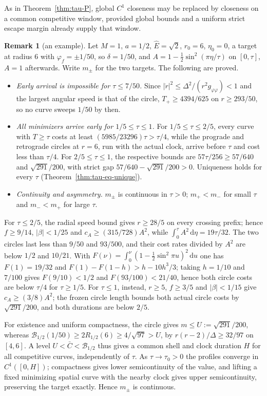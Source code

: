 \documentclass[aip,jmp,amsmath,amssymb,reprint]{revtex4-2}
\newcommand{\Ehat}{\hat E}
\newcommand{\dd}{\mathrm{d}}
\theoremstyle{plain}
\theoremstyle{definition}
\newtheorem{remark}[proposition]{Remark}
\begin{document}
As in Theorem~\ref{thm:tau-P}, global $C^1$ closeness may be replaced by closeness on a common
competitive window, provided global bounds and a uniform strict escape margin already supply that
window.

\begin{remark}[an example]\label{rmk:tau-eq-example}
Let $M=1$, $a=1/2$, $\Ehat=\sqrt2$, $r_0=6$, $\eta_0=0$, a target at radius $6$ with $\varphi_f=\pm1/50$, so
$\delta=1/50$, and $A=1-\frac12\sin^2(\pi\eta/\tau)$ on $[0,\tau]$, $A=1$ afterwards. Write $m_\pm$ for the two
targets. The following are proved.
\begin{itemize}
\item \emph{Early arrival is impossible for $\tau\le7/50$.} Since $|\dot r|^2\le\Delta^2/(r^2g_{\varphi\varphi})<1$
  and the largest angular speed is that of the circle, $T_+\ge4394/625$ on $r\ge293/50$, so no curve
  sweeps $1/50$ by then.
\item \emph{All minimizers arrive early for $1/5\le\tau\le1$.} For $1/5\le\tau\le2/5$, every curve with
  $T\ge\tau$ costs at least $(5985/23296)\tau>\tau/4$, while the prograde and retrograde circles at $r=6$,
  run with the actual clock, arrive before $\tau$ and cost less than $\tau/4$. For $2/5\le\tau\le1$, the
  respective bounds are $57\tau/256\ge57/640$ and $\sqrt{291}/200$, with strict gap
  $57/640-\sqrt{291}/200>0$. Uniqueness holds for every $\tau$ (Theorem~\ref{thm:tau-eq-unique}).
\item \emph{Continuity and asymmetry.} $m_\pm$ is continuous in $\tau>0$; $m_+<m_-$ for small $\tau$ and
  $m_-<m_+$ for large $\tau$.
\end{itemize}
For $\tau\le2/5$, the radial speed bound gives $r\ge28/5$ on every crossing prefix; hence $f\ge9/14$,
$|\beta|<1/25$ and $c_A\ge(315/728)A^2$, while $\int_0^\tau A^2\,\dd\eta=19\tau/32$. The two circles last less
than $9/50$ and $93/500$, and their cost rates divided by $A^2$ are below $1/2$ and $10/21$. With
$F(\nu)=\int_0^\nu(1-\frac12\sin^2\pi u)^2\,\dd u$ one has $F(1)=19/32$ and $F(1)-F(1-h)>h-10h^3/3$; taking
$h=1/10$ and $7/100$ gives $F(9/10)<1/2$ and $F(93/100)<21/40$, hence both circle costs are below
$\tau/4$ for $\tau\ge1/5$. For $\tau\le1$, instead, $r\ge5$, $f\ge3/5$ and $|\beta|<1/15$ give $c_A\ge(3/8)A^2$;
the frozen circle length bounds both actual circle costs by $\sqrt{291}/200$, and both durations are
below $2/5$.

For existence and uniform compactness, the circle gives $m\le U:=\sqrt{291}/200$, whereas
$\mathcal B_{1/2}(1/50)\ge2R_{1/2}(6)\ge4/\sqrt{97}>U$, by $r(r-2)/\Delta\ge32/97$ on $[4,6]$. A level
$U<\bar C<\mathcal B_{1/2}$ thus gives a common shell and clock duration $H$ for all competitive curves,
independently of $\tau$. As $\tau\to\tau_0>0$ the profiles converge in $C^1([0,H])$; compactness gives
lower semicontinuity of the value, and lifting a fixed minimizing spatial curve with the nearby
clock gives upper semicontinuity, preserving the target exactly. Hence $m_\pm$ is continuous.


\end{remark}
\end{document}
